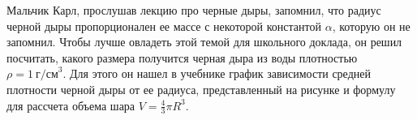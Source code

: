 	Мальчик Карл, прослушав лекцию про черные дыры, запомнил, что радиус черной дыры пропорционален ее массе с некоторой константой $\alpha$, которую он не запомнил. Чтобы лучше овладеть этой темой для школьного доклада, он решил посчитать, какого размера получится черная дыра из воды плотностью $\rho = 1~\text{г/см}^3$. Для этого он нашел в учебнике график зависимости средней плотности черной дыры от ее радиуса, представленный на рисунке и формулу для рассчета объема шара $V = \frac{4}{3}\pi R^3$.